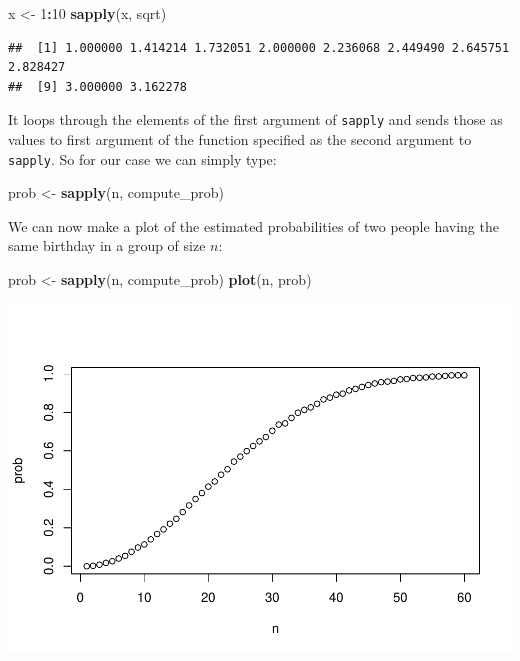 \documentclass[
  openany]{book}
\newenvironment{Shaded}{\begin{snugshade}}{\end{snugshade}}
\newcommand{\DecValTok}[1]{\textcolor[rgb]{0.00,0.00,0.81}{#1}}
\newcommand{\KeywordTok}[1]{\textcolor[rgb]{0.13,0.29,0.53}{\textbf{#1}}}
\newcommand{\NormalTok}[1]{#1}
\newcommand{\OperatorTok}[1]{\textcolor[rgb]{0.81,0.36,0.00}{\textbf{#1}}}
\newcommand{\StringTok}[1]{\textcolor[rgb]{0.31,0.60,0.02}{#1}}
\begin{document}
\begin{Shaded}
\begin{Highlighting}[]
\NormalTok{x <-}\StringTok{ }\DecValTok{1}\OperatorTok{:}\DecValTok{10}
\KeywordTok{sapply}\NormalTok{(x, sqrt)}
\end{Highlighting}
\end{Shaded}

\begin{verbatim}
##  [1] 1.000000 1.414214 1.732051 2.000000 2.236068 2.449490 2.645751 2.828427
##  [9] 3.000000 3.162278
\end{verbatim}

It loops through the elements of the first argument of \texttt{sapply} and sends those as values to first argument of the function specified as the second argument to \texttt{sapply}. So for our case we can simply type:

\begin{Shaded}
\begin{Highlighting}[]
\NormalTok{prob <-}\StringTok{ }\KeywordTok{sapply}\NormalTok{(n, compute_prob)}
\end{Highlighting}
\end{Shaded}

We can now make a plot of the estimated probabilities of two people having the same birthday in a group of size \(n\):

\begin{Shaded}
\begin{Highlighting}[]
\NormalTok{prob <-}\StringTok{ }\KeywordTok{sapply}\NormalTok{(n, compute_prob)}
\KeywordTok{plot}\NormalTok{(n, prob)}
\end{Highlighting}
\end{Shaded}

\includegraphics{DataSciLibArts_files/figure-latex/unnamed-chunk-48-1.pdf}
\end{document}
